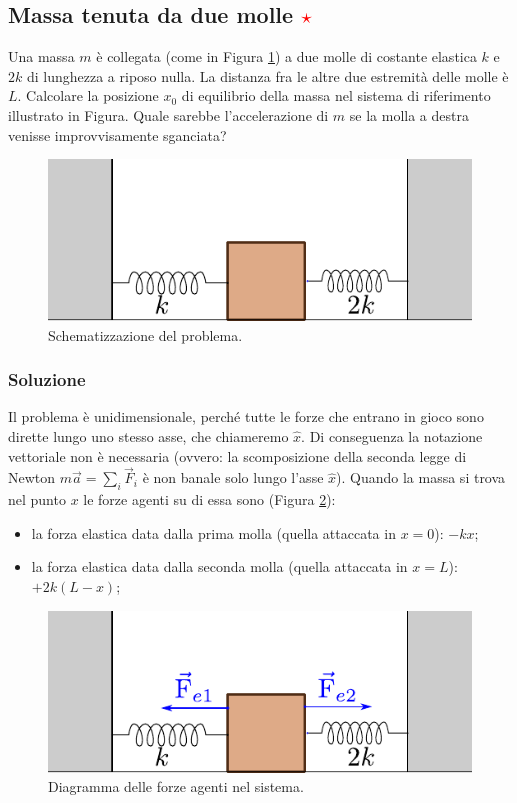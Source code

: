\documentclass[12pt,a4paper]{book}
\newcommand{\rstar}{ \textcolor{red}{$\star$}}
\begin{document}
\subsection{Massa tenuta da due molle \rstar}
Una massa $m$ è collegata (come in Figura \ref{fig:4-p-6-1}) a due molle di costante elastica $k$ e $2k$ di lunghezza a riposo nulla. La distanza fra le altre due estremità delle molle è $L$. Calcolare la posizione $x_0$ di equilibrio della massa nel sistema di riferimento illustrato in Figura. 
Quale sarebbe l'accelerazione di $m$ se la molla a destra venisse improvvisamente sganciata?

\begin{figure}[!ht]
\centering
\includegraphics[scale=1.2]{p-6-1.pdf}
\caption{Schematizzazione del problema. \label{fig:4-p-6-1} }
\end{figure}

\subsubsection*{Soluzione}
Il problema è unidimensionale, perché tutte le forze che entrano in gioco sono dirette lungo uno stesso asse, che chiameremo $\hat{x}$. Di conseguenza la notazione vettoriale non è necessaria (ovvero: la scomposizione della seconda legge di Newton
$m \vec{a} =\sum_i \vec{F}_i$ è non banale solo lungo l'asse $\hat{x}$). 
Quando la massa si trova nel punto $x$ le forze agenti su di essa sono (Figura \ref{fig:4-p-6-2}): 
\begin{itemize}
\item la forza elastica data dalla prima molla (quella attaccata in $x=0$): $-kx$;
\item la forza elastica data dalla seconda molla (quella attaccata in $x=L$): $+2k(L-x)$;
\end{itemize}

 \begin{figure}[!ht]
 \centering
\includegraphics[scale=1.2]{p-6-2.pdf}
\caption{Diagramma delle forze agenti nel sistema.\label{fig:4-p-6-2} }
\end{figure}
\end{document}
